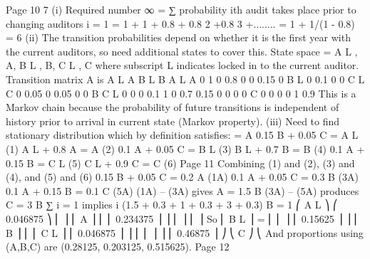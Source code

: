 \documentclass[a4paper,12pt]{article}
\begin{document}

Page 10%
7
(i)
Required number
∞
= ∑ probability ith audit takes place prior to changing auditors
i = 1
= 1 + 1 + 0.8 + 0.8 2 +0.8 3 +........
= 1 + 1/(1 - 0.8) = 6
(ii)
The transition probabilities depend on
whether it is the first year with the
current auditors, so need additional states to cover this.
State space = {A L , A, B L , B, C L , C} where subscript L
indicates locked in to the current auditor.
Transition matrix A is
A L
A
B L
B A L
A
0
1
0
0.8
0
0
0.15 0 B L
0
0.1
0
0
C L
C 0
0.05 0
0.05
0
0
B C L
0
0
0
0.1
1
0
0.7 0.15
0
0
0
0
C
0
0
0
0
1
0.9
This is a Markov chain because the probability
of future transitions is independent of history
prior to arrival in current state (Markov property).
(iii)
Need to find stationary distribution
\pi which by definition satisfies:
\pi = \pi A
0.15 \pi B + 0.05 \pi C = \pi A L (1)
\pi A L + 0.8 \pi A = \pi A (2)
0.1 \pi A + 0.05 \pi C = \pi B L (3)
\pi B L + 0.7 \pi B = \pi B (4)
0.1 \pi A + 0.15 \pi B = \pi C L (5)
\pi C L + 0.9 \pi C = \pi C (6)
Page 11%
Combining (1) and (2), (3) and (4), and (5) and (6)
0.15 \pi B + 0.05 \pi C = 0.2 \pi A (1A)
0.1 \pi A + 0.05 \pi C = 0.3 \pi B (3A)
0.1 \pi A + 0.15 \pi B = 0.1 \pi C (5A)
(1A) – (3A) gives
\pi A = 1.5 \pi B
(3A) – (5A) produces
\pi C = 3 \pi B
∑
\pi i = 1 implies
i
(1.5 + 0.3 + 1 + 0.3 + 3 + 0.3) \pi B = 1
⎛ \pi A L ⎞ ⎛ 0.046875 ⎞
⎜
⎟
⎜ \pi A ⎟ ⎜ ⎜ 0.234375 ⎟ ⎟
⎜
⎟ ⎜
 ⎟
So ⎜ B L ⎟ = ⎜
⎜ \pi ⎟ ⎜ 0.15625 ⎟ ⎟
⎜ B ⎟ ⎜
⎜ \pi C L ⎟ ⎜ 0.046875 ⎟ ⎟
⎜ ⎜
⎟ ⎟ ⎜ 0.46875 ⎟ ⎠
⎝ \pi C ⎠ ⎝
And proportions using (A,B,C) are
(0.28125, 0.203125, 0.515625).
Page 12%
\end{document}
